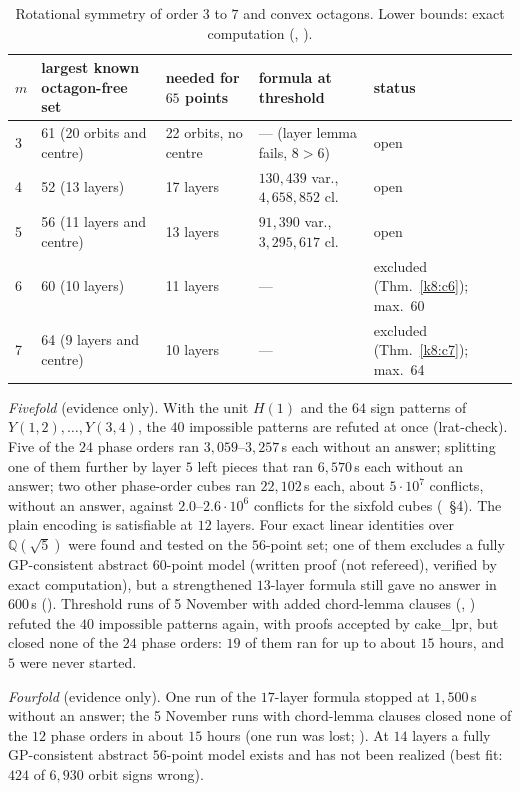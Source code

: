\begin{table}[ht]
\centering\footnotesize
\begin{tabular}{@{}lllll@{}}
\toprule
$m$ & largest known octagon-free set & needed for $65$ points & formula at threshold & status\\
\midrule
3 & 61 (20 orbits and centre) & 22 orbits, no centre & --- (layer lemma fails, $8>6$) & open\\
4 & 52 (13 layers) & 17 layers & $130{,}439$ var., $4{,}658{,}852$ cl. & open\\
5 & 56 (11 layers and centre) & 13 layers & $91{,}390$ var., $3{,}295{,}617$ cl. & open\\
6 & 60 (10 layers) & 11 layers & --- & excluded (Thm.~\ref{k8:c6}); max.\ 60\\
7 & 64 (9 layers and centre) & 10 layers & --- & excluded (Thm.~\ref{k8:c7}); max.\ 64\\
\bottomrule
\end{tabular}
\caption{Rotational symmetry of order $3$ to $7$ and convex octagons. Lower bounds: exact computation (,
).}
\label{k8:tab:status}
\end{table}

\emph{Fivefold} (evidence only). With the unit $H(1)$ and the $64$ sign patterns of $Y(1,2),\dots,Y(3,4)$, the $40$
impossible patterns are refuted at once (lrat-check). Five of the $24$ phase orders ran $3{,}059$--$3{,}257$\,s each
without an answer; splitting one of them further by layer $5$ left pieces that ran $6{,}570$\,s each without an answer;
two other phase-order cubes ran $22{,}102$\,s each, about $5\cdot10^7$ conflicts, without an answer, against
$2.0$--$2.6\cdot10^6$ conflicts for the sixfold cubes (~\S4). The plain encoding is satisfiable at $12$
layers. Four exact linear identities over $\mathbb{Q}(\sqrt5)$ were found and tested on the $56$-point set; one of them
excludes a fully GP-consistent abstract $60$-point model (written proof (not refereed), verified by exact
computation), but a strengthened $13$-layer formula still gave no answer in
$600$\,s (). Threshold runs of 5 November with added chord-lemma clauses (,
) refuted the $40$ impossible patterns again, with proofs accepted by cake\_lpr, but closed none
of the $24$ phase orders: $19$ of them ran for up to about $15$ hours, and $5$ were never started.

\emph{Fourfold} (evidence only). One run of the $17$-layer formula stopped at $1{,}500$\,s without an answer; the
5 November runs with chord-lemma clauses closed none of the $12$ phase orders in about $15$ hours (one run was lost;
). At $14$
layers a fully GP-consistent abstract $56$-point model exists and has not been realized (best fit: $424$ of $6{,}930$
orbit signs wrong).

